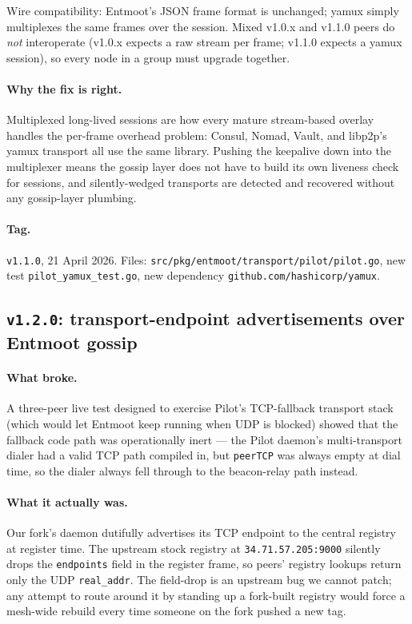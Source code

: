 \documentclass[11pt,a4paper]{article}
\begin{document}
Wire compatibility: Entmoot's JSON frame format is unchanged;
yamux simply multiplexes the same frames over the session.
Mixed v1.0.x and v1.1.0 peers do \emph{not} interoperate
(v1.0.x expects a raw stream per frame; v1.1.0 expects a yamux
session), so every node in a group must upgrade together.

\paragraph{Why the fix is right.} Multiplexed long-lived
sessions are how every mature stream-based overlay handles the
per-frame overhead problem: Consul, Nomad, Vault, and libp2p's
yamux transport all use the same library. Pushing the keepalive
down into the multiplexer means the gossip layer does not have
to build its own liveness check for sessions, and silently-wedged
transports are detected and recovered without any gossip-layer
plumbing.

\paragraph*{Tag.} \texttt{v1.1.0}, 21 April 2026. Files:
\texttt{src/pkg/entmoot/transport/pilot/pilot.go},
new test \texttt{pilot\_yamux\_test.go}, new dependency
\texttt{github.com/hashicorp/yamux}.

\subsection{\texttt{v1.2.0}: transport-endpoint advertisements
over Entmoot gossip}

\paragraph{What broke.} A three-peer live test designed to
exercise Pilot's TCP-fallback transport stack (which would let
Entmoot keep running when UDP is blocked) showed that the
fallback code path was operationally inert --- the Pilot daemon's
multi-transport dialer had a valid TCP path compiled in, but
\texttt{peerTCP} was always empty at dial time, so the dialer
always fell through to the beacon-relay path instead.

\paragraph{What it actually was.} Our fork's daemon dutifully
advertises its TCP endpoint to the central registry at register
time. The upstream stock registry at \texttt{34.71.57.205:9000}
silently drops the \texttt{endpoints} field in the register
frame, so peers' registry lookups return only the UDP
\texttt{real\_addr}. The field-drop is an upstream bug we cannot
patch; any attempt to route around it by standing up a
fork-built registry would force a mesh-wide rebuild every time
someone on the fork pushed a new tag.
\end{document}
